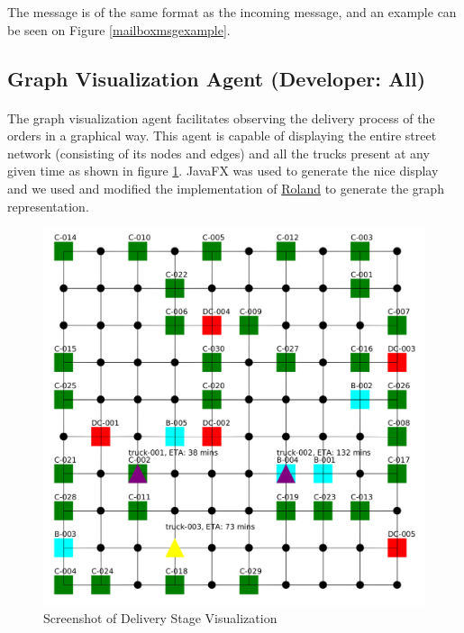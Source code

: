\documentclass[11pt, a4paper]{article}
\begin{document}
\hfill\break
The message is of the same format as the incoming message, and an example can be seen on Figure \ref{mailboxmsgexample}.

	


\newpage
\subsection{Graph Visualization Agent (Developer: All)}\label{GraphVisualizationAgent}
\paragraph{}
The graph visualization agent facilitates observing the delivery process of the orders in a graphical way. This agent is capable of displaying the entire street network (consisting of its nodes and edges) and all the trucks present at any given time as shown in figure \ref{VisualizationScreenshot}. JavaFX was used to generate the nice display and we used and modified the implementation of \href{https://stackoverflow.com/a/30696075}{Roland} to generate the graph representation.

\begin{figure}[h!]
	\centering
	\includegraphics[width=\textwidth]{Visualization.png}
	\caption{Screenshot of Delivery Stage Visualization}
	\label{VisualizationScreenshot}
\end{figure}
\end{document}
